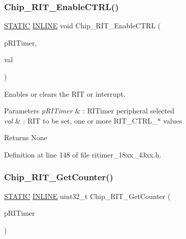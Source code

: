 \subsubsection{\texorpdfstring{Chip\+\_\+\+R\+I\+T\+\_\+\+Enable\+C\+T\+R\+L()}{Chip\_RIT\_EnableCTRL()}}
{\footnotesize\ttfamily \hyperlink{group___l_p_c___types___public___macros_ga10b2d890d871e1489bb02b7e70d9bdfb}{S\+T\+A\+T\+IC} \hyperlink{spifi__18xx__43xx_8h_a2eb6f9e0395b47b8d5e3eeae4fe0c116}{I\+N\+L\+I\+NE} void Chip\+\_\+\+R\+I\+T\+\_\+\+Enable\+C\+T\+RL (\begin{DoxyParamCaption}\item[{\hyperlink{struct_l_p_c___r_i_t_i_m_e_r___t}{L\+P\+C\+\_\+\+R\+I\+T\+I\+M\+E\+R\+\_\+T} $\ast$}]{p\+R\+I\+Timer,  }\item[{uint32\+\_\+t}]{val }\end{DoxyParamCaption})}



Enables or clears the R\+IT or interrupt. 


\begin{DoxyParams}{Parameters}
{\em p\+R\+I\+Timer} & \+: R\+I\+Timer peripheral selected \\
\hline
{\em val} & \+: R\+IT to be set, one or more R\+I\+T\+\_\+\+C\+T\+R\+L\+\_\+$\ast$ values \\
\hline
\end{DoxyParams}
\begin{DoxyReturn}{Returns}
None 
\end{DoxyReturn}


Definition at line 148 of file ritimer\+\_\+18xx\+\_\+43xx.\+h.

\mbox{\label{group___r_i_t_i_m_e_r__18_x_x__43_x_x_ga8993e210c53f74ba84933ef5ef4b58ad}} 
\subsubsection{\texorpdfstring{Chip\+\_\+\+R\+I\+T\+\_\+\+Get\+Counter()}{Chip\_RIT\_GetCounter()}}
{\footnotesize\ttfamily \hyperlink{group___l_p_c___types___public___macros_ga10b2d890d871e1489bb02b7e70d9bdfb}{S\+T\+A\+T\+IC} \hyperlink{spifi__18xx__43xx_8h_a2eb6f9e0395b47b8d5e3eeae4fe0c116}{I\+N\+L\+I\+NE} uint32\+\_\+t Chip\+\_\+\+R\+I\+T\+\_\+\+Get\+Counter (\begin{DoxyParamCaption}\item[{\hyperlink{struct_l_p_c___r_i_t_i_m_e_r___t}{L\+P\+C\+\_\+\+R\+I\+T\+I\+M\+E\+R\+\_\+T} $\ast$}]{p\+R\+I\+Timer }\end{DoxyParamCaption})}



